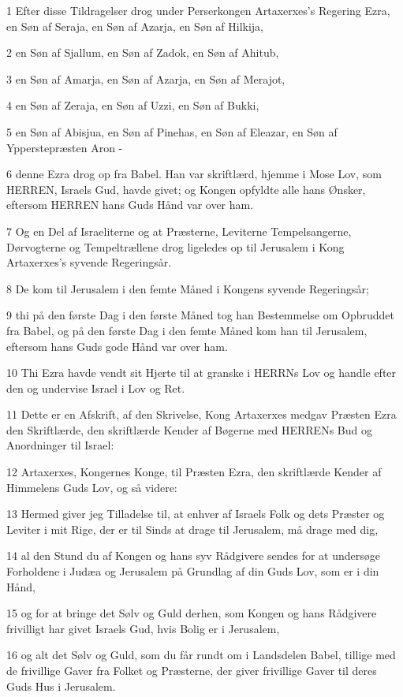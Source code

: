 \par 1 Efter disse Tildragelser drog under Perserkongen Artaxerxes's Regering Ezra, en Søn af Seraja, en Søn af Azarja, en Søn af Hilkija,
\par 2 en Søn af Sjallum, en Søn af Zadok, en Søn af Ahitub,
\par 3 en Søn af Amarja, en Søn af Azarja, en Søn af Merajot,
\par 4 en Søn af Zeraja, en Søn af Uzzi, en Søn af Bukki,
\par 5 en Søn af Abisjua, en Søn af Pinehas, en Søn af Eleazar, en Søn af Ypperstepræsten Aron -
\par 6 denne Ezra drog op fra Babel. Han var skriftlærd, hjemme i Mose Lov, som HERREN, Israels Gud, havde givet; og Kongen opfyldte alle hans Ønsker, eftersom HERREN hans Guds Hånd var over ham.
\par 7 Og en Del af Israeliterne og at Præsterne, Leviterne Tempelsangerne, Dørvogterne og Tempeltrællene drog ligeledes op til Jerusalem i Kong Artaxerxes's syvende Regeringsår.
\par 8 De kom til Jerusalem i den femte Måned i Kongens syvende Regeringsår;
\par 9 thi på den første Dag i den første Måned tog han Bestemmelse om Opbruddet fra Babel, og på den første Dag i den femte Måned kom han til Jerusalem, eftersom hans Guds gode Hånd var over ham.
\par 10 Thi Ezra havde vendt sit Hjerte til at granske i HERRNs Lov og handle efter den og undervise Israel i Lov og Ret.
\par 11 Dette er en Afskrift, af den Skrivelse, Kong Artaxerxes medgav Præsten Ezra den Skriftlærde, den skriftlærde Kender af Bøgerne med HERRENs Bud og Anordninger til Israel:
\par 12 Artaxerxes, Kongernes Konge, til Præsten Ezra, den skriftlærde Kender af Himmelens Guds Lov, og så videre:
\par 13 Hermed giver jeg Tilladelse til, at enhver af Israels Folk og dets Præster og Leviter i mit Rige, der er til Sinds at drage til Jerusalem, må drage med dig,
\par 14 al den Stund du af Kongen og hans syv Rådgivere sendes for at undersøge Forholdene i Judæa og Jerusalem på Grundlag af din Guds Lov, som er i din Hånd,
\par 15 og for at bringe det Sølv og Guld derhen, som Kongen og hans Rådgivere frivilligt har givet Israels Gud, hvis Bolig er i Jerusalem,
\par 16 og alt det Sølv og Guld, som du får rundt om i Landsdelen Babel, tillige med de frivillige Gaver fra Folket og Præsterne, der giver frivillige Gaver til deres Guds Hus i Jerusalem.
